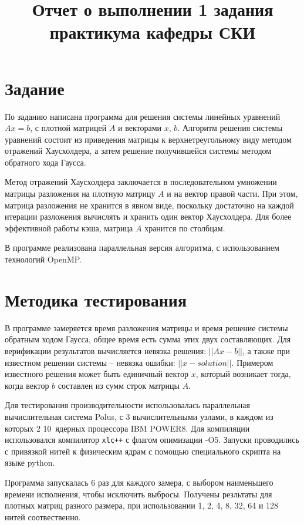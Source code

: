 \documentclass[12pt, oneside, a4paper]{article}
\begin{document}
\title{Отчет о выполнении 1 задания практикума кафедры СКИ}

\section{Задание}

По заданию написана программа для решения системы линейных уравнений $Ax = b$, с плотной матрицей $A$ и векторами $x$, $b$. Алгоритм решения системы уравнений состоит из приведения матрицы к верхнетреугольному виду методом отражений Хаусхолдера, а затем решение получившейся системы методом обратного хода Гаусса.

Метод отражений Хаусхолдера заключается в последовательном умножении матрицы разложения на плотную матрицу $A$ и на вектор правой части. При этом, матрица разложения не хранится в явном виде, поскольку достаточно на каждой итерации разложения вычислять и хранить один вектор Хаусхолдера. Для более эффективной работы кэша, матрица $A$ хранится по столбцам.

В программе реализована параллельная версия алгоритма, с использованием технологий OpenMP.

\section{Методика тестирования}

В программе замеряется время разложения матрицы и время решение системы обратным ходом Гаусса, общее время есть сумма этих двух составляющих. Для верификации результатов вычисляется невязка решения: $||Ax - b||$, а также при известном решении системы -- невязка ошибки: $||x - solution||$. Примером известного решения может быть единичный вектор $x$, который возникает тогда, когда вектор $b$ составлен из сумм строк матрицы $A$.

Для тестирования производительности использовалась параллельная вычислительная система Polus, с 3 вычислительными узлами, в каждом из которых 2 10~ядерных процессора IBM POWER8. Для компиляции использовался компилятор \texttt{xlc++} с флагом опимизации -O5. Запуски проводились с привязкой нитей к физическим ядрам с помощью специального скрипта на языке python.

Программа запускалась 6 раз для каждого замера, с выбором наименьшего времени исполнения, чтобы исключить выбросы. Получены резльтаты для плотных матриц разного размера, при использовании 1, 2, 4, 8, 32, 64 и 128 нитей соотвественно.
\end{document}

